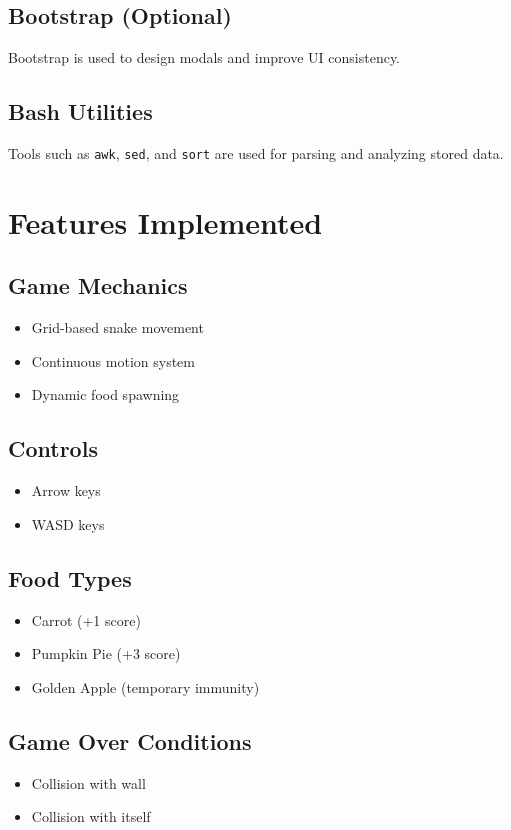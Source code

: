 \documentclass[12pt]{article}
\begin{document}
\subsection{Bootstrap (Optional)}
Bootstrap is used to design modals and improve UI consistency.

\subsection{Bash Utilities}
Tools such as \texttt{awk}, \texttt{sed}, and \texttt{sort} are used for parsing and analyzing stored data.

\section{Features Implemented}

\subsection{Game Mechanics}
\begin{itemize}
    \item Grid-based snake movement
    \item Continuous motion system
    \item Dynamic food spawning
\end{itemize}

\subsection{Controls}
\begin{itemize}
    \item Arrow keys
    \item WASD keys
\end{itemize}

\subsection{Food Types}
\begin{itemize}
    \item Carrot (+1 score)
    \item Pumpkin Pie (+3 score)
    \item Golden Apple (temporary immunity)
\end{itemize}

\subsection{Game Over Conditions}
\begin{itemize}
    \item Collision with wall
    \item Collision with itself
\end{itemize}
\end{document}
